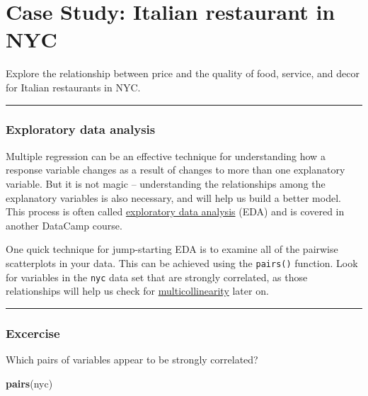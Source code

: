 \documentclass[]{book}
\newenvironment{Shaded}{\begin{snugshade}}{\end{snugshade}}
\newcommand{\KeywordTok}[1]{\textcolor[rgb]{0.13,0.29,0.53}{\textbf{#1}}}
\newcommand{\NormalTok}[1]{#1}
\begin{document}
\chapter{Case Study: Italian restaurant in
NYC}\label{case-study-italian-restaurant-in-nyc}

Explore the relationship between price and the quality of food, service,
and decor for Italian restaurants in NYC.

\begin{center}\rule{0.5\linewidth}{\linethickness}\end{center}

\subsection*{Exploratory data analysis}\label{exploratory-data-analysis}

Multiple regression can be an effective technique for understanding how
a response variable changes as a result of changes to more than one
explanatory variable. But it is not magic -- understanding the
relationships among the explanatory variables is also necessary, and
will help us build a better model. This process is often called
\href{https://en.wikipedia.org/wiki/Exploratory_data_analysis}{exploratory
data analysis} (EDA) and is covered in another DataCamp course.

One quick technique for jump-starting EDA is to examine all of the
pairwise scatterplots in your data. This can be achieved using the
\texttt{pairs()} function. Look for variables in the \texttt{nyc} data
set that are strongly correlated, as those relationships will help us
check for
\href{https://en.wikipedia.org/wiki/Multicollinearity}{multicollinearity}
later on.

\begin{center}\rule{0.5\linewidth}{\linethickness}\end{center}

\subsection*{Excercise}\label{excercise}

Which pairs of variables appear to be strongly correlated?

\begin{Shaded}
\begin{Highlighting}[]
\KeywordTok{pairs}\NormalTok{(nyc)}
\end{Highlighting}
\end{Shaded}
\end{document}
